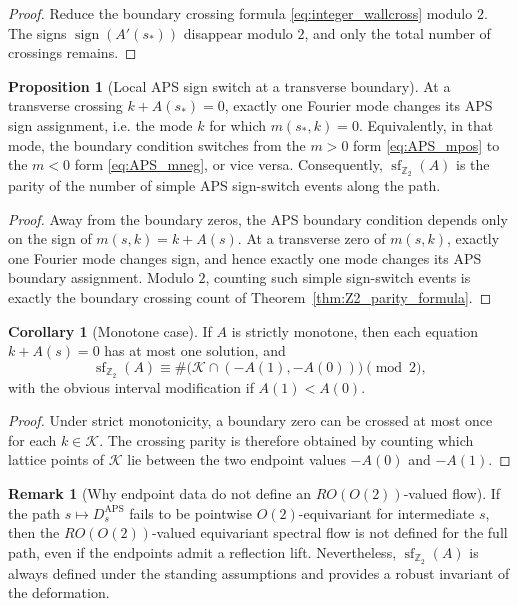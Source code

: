 \documentclass[11pt]{article}
\theoremstyle{definition}
\newtheorem{proposition}[theorem]{Proposition}
\newtheorem{corollary}[theorem]{Corollary}
\newtheorem{remark}[remark]{Remark}
\DeclareMathOperator{\APS}{APS}
\numberwithin{equation}{section}
\begin{document}
\begin{proof}
Reduce the boundary crossing formula \eqref{eq:integer_wallcross} modulo \(2\). The signs
\(\operatorname{sign}(A'(s_*))\) disappear modulo \(2\), and only the total number of
crossings remains.
\end{proof}

\begin{proposition}[Local APS sign switch at a transverse boundary]
\label{prop:rank_one_jump_section8}
At a transverse crossing \(k+A(s_*)=0\), exactly one Fourier mode changes its
APS sign assignment, i.e. the mode \(k\) for which \(m(s_*,k)=0\).
Equivalently, in that mode, the boundary condition switches from the \(m>0\)
form \eqref{eq:APS_mpos} to the \(m<0\) form \eqref{eq:APS_mneg}, or vice
versa. Consequently, \(\operatorname{sf}_{\mathbb Z_2}(A)\) is the parity of
the number of simple APS sign-switch events along the path.
\end{proposition}

\begin{proof}
Away from the boundary zeros, the APS boundary condition depends only on the sign of
\(m(s,k)=k+A(s)\). At a transverse zero of \(m(s,k)\), exactly one Fourier
mode changes sign, and hence exactly one mode changes its APS boundary
assignment. Modulo \(2\), counting such simple sign-switch events is exactly
the boundary crossing count of Theorem~\ref{thm:Z2_parity_formula}.
\end{proof}

\begin{corollary}[Monotone case]
\label{cor:monotone_wall_parity}
If \(A\) is strictly monotone, then each equation \(k+A(s)=0\) has at most one solution, and
\begin{equation}\label{eq:SF_Z2_monotone}
\operatorname{sf}_{\mathbb Z_2}(A)
\equiv
\#\bigl(\mathcal K\cap(-A(1),-A(0))\bigr)
\pmod 2,
\end{equation}
with the obvious interval modification if \(A(1)<A(0)\).
\end{corollary}


\begin{proof}
Under strict monotonicity, a boundary zero can be crossed at most once for each \(k\in\mathcal K\). The
crossing parity is therefore obtained by counting which lattice points of \(\mathcal K\) lie
between the two endpoint values \(-A(0)\) and \(-A(1)\).
\end{proof}

\begin{remark}[Why endpoint data do not define an \texorpdfstring{$RO(O(2))$}{RO(O(2))}-valued flow]
\label{rem:endpoints_not_enough_section8}
If the path \(s\mapsto D_s^{\APS}\) fails to be pointwise \(O(2)\)-equivariant for intermediate \(s\), then the \(RO(O(2))\)-valued equivariant spectral flow is not defined for the full path, even if the endpoints admit a reflection lift. Nevertheless,
\(\operatorname{sf}_{\mathbb Z_2}(A)\) is always defined under the standing assumptions and provides a robust invariant of the deformation.
\end{remark}
\end{document}
